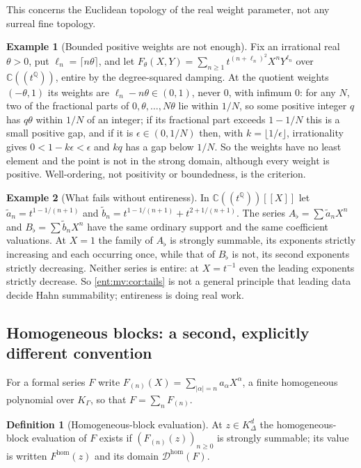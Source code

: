 \documentclass[11pt]{article}
\theoremstyle{plain}
\theoremstyle{plain}
\theoremstyle{plain}
\theoremstyle{definition}
\newtheorem{definition}[definition]{Definition}
\theoremstyle{definition}
\theoremstyle{definition}
\newtheorem{example}[example]{Example}
\theoremstyle{definition}
\theoremstyle{remark}
\newcommand{\C}{\mathbb C}\newcommand{\R}{\mathbb R}
\newcommand{\Q}{\mathbb Q}\newcommand{\Z}{\mathbb Z}\newcommand{\N}{\mathbb N}
\newcommand{\K}{K_\Gamma}\newcommand{\KD}{K_\Delta}
\begin{document}
This concerns the Euclidean topology of the real weight parameter, not any
surreal fine topology.

\begin{example}[Bounded positive weights are not enough]\label{ent:mv:ex:dense}
Fix an irrational real $\theta>0$, put $\ell_n=\lceil n\theta\rceil$, and let
$F_\theta(X,Y)=\sum_{n\ge1}t^{(n+\ell_n)^2}X^nY^{\ell_n}$ over $\C((t^\Q))$,
entire by the degree-squared damping. At the quotient weights $(-\theta,1)$
its weights are $\ell_n-n\theta\in(0,1)$, never $0$, with infimum $0$: for any
$N$, two of the fractional parts of $0,\theta,\ldots,N\theta$ lie within
$1/N$, so some positive integer $q$ has $q\theta$ within $1/N$ of an integer;
if its fractional part exceeds $1-1/N$ this is a small positive gap, and if
it is $\epsilon\in(0,1/N)$ then, with $k=\lfloor1/\epsilon\rfloor$,
irrationality gives $0<1-k\epsilon<\epsilon$ and $kq$ has a gap below $1/N$.
So the weights have no least element and the point is not in the strong
domain, although every weight is positive. Well-ordering, not positivity or
boundedness, is the criterion.
\end{example}

\begin{example}[What fails without entireness]\label{ent:mv:ex:hidden}
In $\C((t^\Q))[[X]]$ let $\tilde a_n=t^{1-1/(n+1)}$ and
$\tilde b_n=t^{1-1/(n+1)}+t^{2+1/(n+1)}$. The series $A_\flat=\sum\tilde
a_nX^n$ and $B_\flat=\sum\tilde b_nX^n$ have the same ordinary support and the
same coefficient valuations. At $X=1$ the family of $A_\flat$ is strongly
summable, its exponents strictly increasing and each occurring once, while
that of $B_\flat$ is not, its second exponents strictly decreasing. Neither
series is entire: at $X=t^{-1}$ even the leading exponents strictly
decrease. So \cref{ent:mv:cor:tails} is not a general principle that leading
data decide Hahn summability; entireness is doing real work.
\end{example}

\subsection{Homogeneous blocks: a second, explicitly different convention}
\label{ent:mv:subsec:blocks}
For a formal series $F$ write $F_{(n)}(X)=\sum_{|\alpha|=n}a_\alpha X^\alpha$,
a finite homogeneous polynomial over $\K$, so that $F=\sum_nF_{(n)}$.

\begin{definition}[Homogeneous-block evaluation]\label{ent:mv:def:block}
At $z\in\KD^d$ the homogeneous-block evaluation of $F$ exists if
$(F_{(n)}(z))_{n\ge0}$ is strongly summable; its value is written
$F^{\mathrm{hom}}(z)$ and its domain $\mathcal D^{\mathrm{hom}}(F)$.
\end{definition}
\end{document}
